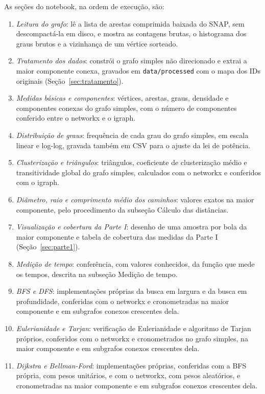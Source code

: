 As seções do notebook, na ordem de execução, são:
\begin{enumerate}
  \item \emph{Leitura do grafo}: lê a lista de arestas comprimida baixada do SNAP, sem descompactá-la em disco, e mostra as contagens brutas, o histograma dos graus brutos e a vizinhança de um vértice sorteado.
  \item \emph{Tratamento dos dados}: constrói o grafo simples não direcionado e extrai a maior componente conexa, gravados em \texttt{data/processed} com o mapa dos IDs originais (Seção~\ref{sec:tratamento}).
  \item \emph{Medidas básicas e componentes}: vértices, arestas, graus, densidade e componentes conexas do grafo simples, com o número de componentes conferido entre o networkx e o igraph.
  \item \emph{Distribuição de graus}: frequência de cada grau do grafo simples, em escala linear e log-log, gravada também em CSV para o ajuste da lei de potência.
  \item \emph{Clusterização e triângulos}: triângulos, coeficiente de clusterização médio e transitividade global do grafo simples, calculados com o networkx e conferidos com o igraph.
  \item \emph{Diâmetro, raio e comprimento médio dos caminhos}: valores exatos na maior componente, pelo procedimento da subseção Cálculo das distâncias.
  \item \emph{Visualização e cobertura da Parte I}: desenho de uma amostra por bola da maior componente e tabela de cobertura das medidas da Parte I (Seção~\ref{sec:parte1}).
  \item \emph{Medição de tempo}: conferência, com valores conhecidos, da função que mede os tempos, descrita na subseção Medição de tempo.
  \item \emph{BFS e DFS}: implementações próprias da busca em largura e da busca em profundidade, conferidas com o networkx e cronometradas na maior componente e em subgrafos conexos crescentes dela.
  \item \emph{Eulerianidade e Tarjan}: verificação de Eulerianidade e algoritmo de Tarjan próprios, conferidos com o networkx e cronometrados no grafo simples, na maior componente e em subgrafos conexos crescentes dela.
  \item \emph{Dijkstra e Bellman-Ford}: implementações próprias, conferidas com a BFS própria, com pesos unitários, e com o networkx, com pesos aleatórios, e cronometradas na maior componente e em subgrafos conexos crescentes dela.

\end{enumerate}
